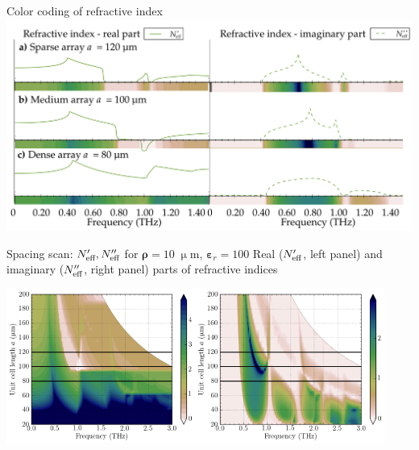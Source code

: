 \documentclass[t]{beamer} \usepackage[english]{babel} \usepackage[utf8]{inputenc} \usetheme{Frankfurt} %
\begin{document}
\begin{frame}{Color coding of refractive index}	%
\includegraphics[width=1.\framewidth]{../img/ERods_sketch_of_separate_spectra_to_continuous_scan.pdf}
\end{frame} 		%

\begin{frame}{Spacing scan: $N_{\text{eff} }', N_{\text{eff} }''$  for $\pmb\rho=10\;\upmu$m, $\pmb\varepsilon_r=100$}	%
Real ($N_{\text{eff} }'$, left panel) and imaginary ($N_{\text{eff} }''$, right panel) parts of refractive indices 

{\centering
\mbox{\includegraphics[width=62mm]{../img/ERods_eps100_spacingscan_Nre.pdf}\includegraphics[width=62mm]{../img/ERods_eps100_spacingscan_Nim.pdf}} \vspace{-5mm} }
\end{frame} 		%
\end{document}
